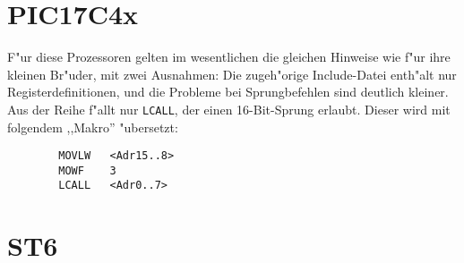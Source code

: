 \documentclass[12pt,a4paper,twoside]{report}
\newcommand{\tty}[1]{{\tt #1}}
\begin{document}
{%

\section{PIC17C4x}

F"ur diese Prozessoren gelten im wesentlichen die gleichen Hinweise wie
f"ur ihre kleinen Br"uder, mit zwei Ausnahmen: Die zugeh"orige Include-Datei
enth"alt nur Registerdefinitionen, und die Probleme bei Sprungbefehlen
sind deutlich kleiner.  Aus der Reihe f"allt nur \tty{LCALL}, der einen
16-Bit-Sprung erlaubt.  Dieser wird mit folgendem ,,Makro'' "ubersetzt:
\begin{verbatim}
        MOVLW   <Adr15..8>
        MOWF    3
        LCALL   <Adr0..7>
\end{verbatim}


\section{ST6}

}
\end{document}
